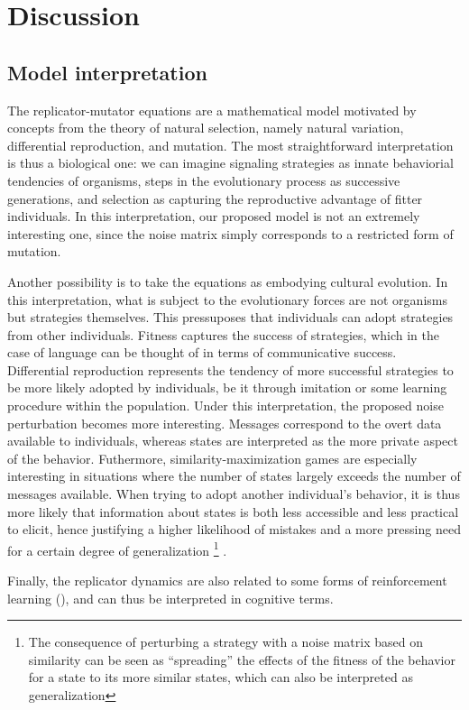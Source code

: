\section{Discussion}
\label{sec:discussion}

\subsection{Model interpretation}
The replicator-mutator equations are a mathematical model motivated by concepts from the theory of natural selection, namely natural variation, differential reproduction, and mutation.
The most straightforward interpretation is thus a biological one: we can imagine signaling strategies as innate behaviorial tendencies of organisms, steps in the evolutionary process as successive generations, and selection as capturing the reproductive advantage of fitter individuals.
In this interpretation, our proposed model is not an extremely interesting one, since the noise matrix simply corresponds to a restricted form of mutation.

Another possibility is to take the equations as embodying cultural evolution.
In this interpretation, what is subject to the evolutionary forces are not organisms but strategies themselves.
This pressuposes that individuals can adopt strategies from other individuals.
Fitness captures the success of strategies, which in the case of language can be thought of in terms of communicative success.
Differential reproduction represents the tendency of more successful strategies to be more likely adopted by individuals, be it through imitation or some learning procedure within the population.
Under this interpretation, the proposed noise perturbation becomes more interesting.
Messages correspond to the overt data available to individuals, whereas states are interpreted as the more private aspect of the behavior.
Futhermore, similarity-maximization games are especially interesting in situations where the number of states largely exceeds the number of messages available.
When trying to adopt another individual's behavior, it is thus more likely that information about states is both less accessible and less practical to elicit, hence justifying a higher likelihood of mistakes and a more pressing need for a certain degree of generalization%
\footnote{The consequence of perturbing a strategy with a noise matrix based on similarity can be seen as ``spreading'' the effects of the fitness of the behavior for a state to its more similar states, which can also be interpreted as generalization}%
.

Finally, the replicator dynamics are also related to some forms of reinforcement learning (\cite{Borgers1997,Hopkins2005,Beggs2005}), and can thus be interpreted in cognitive terms.







